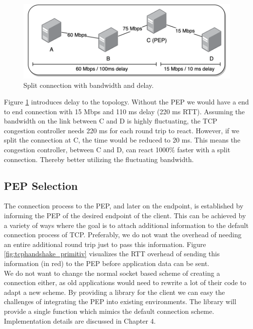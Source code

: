 \documentclass[a4paper,english, 11pt]{report}
\begin{document}
\begin{figure}[h!] %
	\centering
	\includegraphics[scale=0.6]{../diagrams/drawio/bandwidth_delay.png}
  	\caption{Split connection with bandwidth and delay.}
  	\label{fig:pep_bandwidth_delay}
\end{figure}

Figure \ref{fig:pep_bandwidth_delay} introduces delay to the topology. Without the PEP we would have a end to end connection with 15 Mbps and 110 ms delay (220 ms RTT). Assuming the bandwidth on the link between C and D is highly fluctuating, the TCP congestion controller needs 220 ms for each round trip to react. However, if we split the connection at C, the time would be reduced to 20 ms. This means the congestion controller, between C and D, can react 1000\% faster with a split connection. Thereby better utilizing the fluctuating bandwidth.
 
\subsection{PEP Selection}
The connection process to the PEP, and later on the endpoint, is established by informing the PEP of the desired endpoint of the client. This can be achieved by a variety of ways where the goal is to attach additional information to the default connection process of TCP. Preferably, we do not want the overhead of needing an entire additional round trip just to pass this information. Figure \ref{fig:tcphandshake_primitiv} visualizes the RTT overhead of sending this information (in red) to the PEP before application data can be sent.\\

We do not want to change the normal socket based scheme of creating a connection either, as old applications would need to rewrite a lot of their code to adapt a new scheme. By providing a library for the client we can easy the challenges of integrating the PEP into existing environments. The library will provide a single function which mimics the default connection scheme. Implementation details are discussed in Chapter 4.
\end{document}
